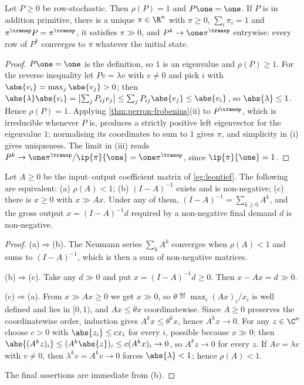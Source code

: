 \begin{corollary}\label{cor:stochastic-perron}
	Let $P\geq0$ be row-stochastic. Then $\rho(P)=1$ and $P\one=\one$. If $P$ is in
	addition primitive, there is a unique $\pi\in\R^n$ with $\pi\geq0$,
	$\sum_i\pi_i=1$ and $\pi^{\transp}P=\pi^{\transp}$, it satisfies $\pi\gg0$, and
	$P^{k}\to\one\pi^{\transp}$ entrywise: every row of $P^{k}$ converges to $\pi$
	whatever the initial state.
\end{corollary}

\begin{proof}
	$P\one=\one$ is the definition, so $1$ is an eigenvalue and $\rho(P)\geq1$. For
	the reverse inequality let $Pv=\lambda v$ with $v\neq0$ and pick $i$ with
	$\abs{v_i}=\max_j\abs{v_j}>0$; then
	$\abs{\lambda}\abs{v_i}=\bigl\lvert\sum_jP_{ij}v_j\bigr\rvert
		\leq\sum_jP_{ij}\abs{v_j}\leq\abs{v_i}$, so $\abs{\lambda}\leq1$. Hence
	$\rho(P)=1$. Applying \autoref{thm:perron-frobenius}(ii) to $P^{\transp}$,
	which is irreducible whenever $P$ is, produces a strictly positive left
	eigenvector for the eigenvalue $1$; normalising its coordinates to sum to $1$
	gives $\pi$, and simplicity in (i) gives uniqueness. The limit in (iii) reads
	$P^{k}\to\one\pi^{\transp}/\ip{\pi}{\one}=\one\pi^{\transp}$, since
	$\ip{\pi}{\one}=1$.
\end{proof}

\begin{corollary}\label{cor:hawkins-simon}
	Let $A\geq0$ be the input--output coefficient matrix of \autoref{eg:leontief}.
	The following are equivalent: (a) $\rho(A)<1$; (b) $(I-A)^{-1}$ exists and is
	non-negative; (c) there is $x\geq0$ with $x\gg Ax$. Under any of them,
	$(I-A)^{-1}=\sum_{k\geq0}A^{k}$, and the gross output $x=(I-A)^{-1}d$
	required by a non-negative final demand $d$ is non-negative.
\end{corollary}

\begin{proof}
	(a)$\Rightarrow$(b). The Neumann series $\sum_kA^{k}$ converges when
	$\rho(A)<1$ and sums to $(I-A)^{-1}$, which is then a sum of non-negative
	matrices.

	(b)$\Rightarrow$(c). Take any $d\gg0$ and put $x=(I-A)^{-1}d\geq0$. Then
	$x-Ax=d\gg0$.

	(c)$\Rightarrow$(a). From $x\gg Ax\geq0$ we get $x\gg0$, so
	$\theta\eqdef\max_i(Ax)_i/x_i$ is well defined and lies in $[0,1)$, and
	$Ax\leq\theta x$ coordinatewise. Since $A\geq0$ preserves the coordinatewise
	order, induction gives $A^{k}x\leq\theta^{k}x$, hence $A^{k}x\to0$. For any
	$z\in\C^n$ choose $c>0$ with $\abs{z_i}\leq cx_i$ for every $i$, possible
	because $x\gg0$; then $\abs{(A^{k}z)_i}\leq(A^{k}\abs{z})_i\leq c(A^{k}x)_i\to0$,
	so $A^{k}z\to0$ for every $z$. If $Av=\lambda v$ with $v\neq0$, then
	$\lambda^{k}v=A^{k}v\to0$ forces $\abs{\lambda}<1$; hence $\rho(A)<1$.

	The final assertions are immediate from (b).
\end{proof}

